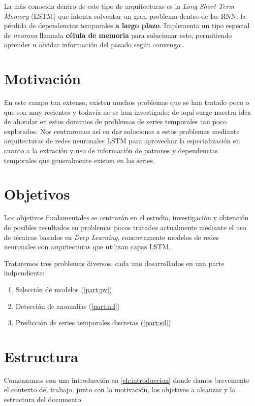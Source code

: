 La más conocida dentro de este tipo de arquitecturas es la \emph{Long Short Term Memory} (LSTM) \cite{hochreiter1997long} que intenta solventar un gran problema dentro de las RNN: la pérdida de dependencias temporales \textbf{a largo plazo}. Implementa un tipo especial de \emph{neurona} llamada \textbf{célula de memoria} para solucionar esto, permitiendo aprender u olvidar información del pasado según convenga \cite{wang2017origin}.

\section{Motivación}

En este campo tan extenso, existen muchos problemas que se han tratado poco o que son muy recientes y todavía no se han investigado; de aquí surge nuestra idea de ahondar en estos dominios de problemas de series temporales tan poco explorados. Nos centraremos así en dar soluciones a estos problemas mediante arquitecturas de redes neuronales LSTM para aprovechar la especialización en cuanto a la extración y uso de información de patrones y dependencias temporales que generalmente existen en las series.

\section{Objetivos}

Los objetivos fundamentales se centrarán en el estudio, investigación y obtención de posibles resultados en problemas pocos tratados actualmente mediante el uso de técnicas basados en \emph{Deep Learning}, concretamente modelos de redes neuronales con arquitecturas que utilizan capas LSTM.

Trataremos tres problemas diversos, cada uno desarrollados en una parte indpendiente:

\begin{enumerate}
  \item Selección de modelos (\autoref{part:pv})
  \item Detección de anomalías (\autoref{part:ad})
  \item Predicción de series temporales discretas (\autoref{part:sd})
\end{enumerate}

\section{Estructura}

Comenzamos con una introducción en \autoref{ch:introduccion} donde damos brevemente el contexto del trabajo, junto con la motivación, los objetivos a alcanzar y la estructura del documento.

